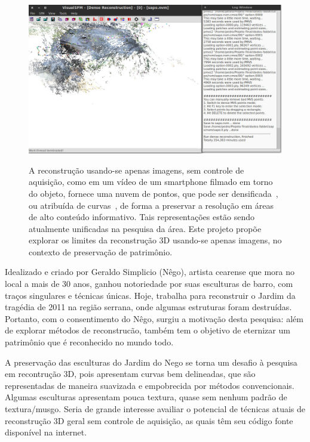 \begin{figure} [!h]
	\centering
	\includegraphics[width=1\linewidth]{figs/rec3d.jpg}
	\label{fig:rec3d}
	\caption{A reconstrução usando-se apenas imagens, sem controle de aquisição, 
	   como em um vídeo de um smartphone filmado em torno do objeto, fornece uma
	   nuvem de pontos, que pode ser
	   densificada~\cite{snavely2010bundler,wu2011visualsfm,furukawa2007dense,mve}, ou
	   atribuída de
	   curvas~\cite{Usumezbas:Fabbri:Kimia:ECCV16,Fabbri:Kimia:IJCV2016,Fabbri:Kimia:CVPR10,Fabbri:Giblin:Kimia:ECCV12}, de forma a preservar a resolução
	   em áreas de alto conteúdo informativo. Tais representações estão sendo
	   atualmente unificadas na pesquisa da área. Este projeto propõe explorar os
	   limites da reconstrução 3D usando-se apenas imagens, no contexto de
	   preservação de patrimônio.}
\end{figure}


Idealizado e criado por Geraldo Simplicio (Nêgo), artista cearense que mora no 
local a mais de 30 anos, ganhou notoriedade por suas esculturas de barro, com traços 
singulares e técnicas únicas. Hoje, trabalha para reconstruir o Jardim da tragédia de 
2011 na região serrana, onde algumas estruturas foram destruídas. Portanto, com o 
consentimento do Nêgo, surgiu a motivação desta pesquisa: além de explorar métodos de 
reconstrucão, também tem o objetivo de eternizar um patrimônio que é reconhecido no mundo
todo.

A preservação das esculturas do Jardim do Nego se torna um desafio à pesquisa em
recontrução 3D, pois apresentam curvas bem delineadas, que são 
representadas de maneira suavizada e empobrecida por métodos convencionais.
Algumas esculturas apresentam pouca textura, quase sem nenhum padrão de textura/musgo.
Seria de grande interesse availiar o potencial de técnicas atuais de
reconstrução 3D geral sem controle de aquisição, as quais têm seu código fonte
disponível na internet.


